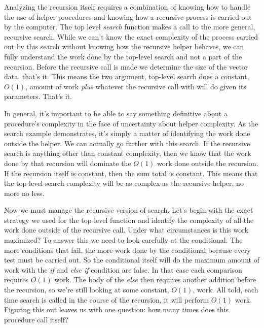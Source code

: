 \documentclass[]{tufte-handout}
\begin{document}
Analyzing the recursion itself requires a combination of knowing how to handle the use of helper procedures and knowing how a recursive process is carried out by the computer. The top level \textit{search} function makes a call to the more general, recursive search.  While we can't know the exact complexity of the process carried out by this search without knowing how the recursive helper behaves, we can fully understand the work done by the top-level search and not a part of the recursion. Before the recursive call is made we determine the size of the vector data, that's it. This means the two argument, top-level search does a constant, $O(1)$, amount of work \textit{plus} whatever the recursive call with will do given its parameters. That's it.

In general, it's important to be able to say something definitive about a procedure's complexity in the face of uncertainty about helper complexity. As the search example demonstrates, it's simply a matter of identifying the work done outside the helper. We can actually go further with this search. If the recursive search is anything other than constant complexity, then we know that the work done by that recursion will dominate the $O(1)$ work done outside the recursion. If the recursion itself is constant, then the sum total is constant. This means that the top level search complexity will be as complex as the recursive helper, no more no less.

Now we must manage the recursive version of search. Let's begin with the exact strategy we used for the top-level function and identify the complexity of all the work done outside of the recursive call. Under what circumstances is this work maximized? To answer this we need to look carefully at the conditional. The more conditions that fail, the more work done by the conditional because every test must be carried out.  So the conditional itself will do the maximum amount of work with the \textit{if} and \textit{else if} condition are false. In that case each comparison requires $O(1)$ work. The body of the \textit{else} then requires another addition before the recursion, so we're still looking at some constant, $O(1)$, work. All told, each time search is called in the course of the recursion, it will perform $O(1)$ work.  Figuring this out leaves us with one question: how many times does this procedure call itself?
\end{document}
